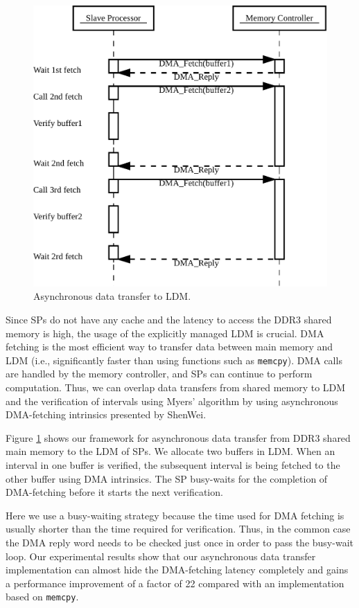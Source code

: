 \documentclass[conference]{IEEEtran}
\begin{document}
\begin{figure}[!htb]
  \includegraphics[width=1\linewidth]{figures/AsyncTrans}
  \caption{Asynchronous data transfer to LDM.}
  \label{AsyncTrans}
\end{figure}

Since SPs do not have any cache and the latency to access the DDR3
shared memory is high, the usage of the explicitly managed LDM is
crucial.  DMA fetching is the most efficient way to transfer data
between main memory and LDM (i.e., significantly faster than using
functions such as \texttt{memcpy}). DMA calls are handled by the
memory controller, and SPs can continue to perform computation. Thus,
we can overlap data transfers from shared memory to LDM and the
verification of intervals using Myers' algorithm by using asynchronous
DMA-fetching intrinsics presented by ShenWei.

Figure \ref{AsyncTrans} shows our framework for asynchronous data
transfer from DDR3 shared main memory to the LDM of SPs. We allocate
two buffers in LDM. When an interval in one buffer is verified, the
subsequent interval is being fetched to the other buffer using DMA
intrinsics. The SP busy-waits for the completion of DMA-fetching
before it starts the next verification.

Here we use a busy-waiting strategy because the time used for DMA
fetching is usually shorter than the time required for
verification. Thus, in the common case the DMA reply word needs to be
checked just once in order to pass the busy-wait loop. Our
experimental results show that our asynchronous data transfer
implementation can almost hide the DMA-fetching latency completely and
gains a performance improvement of a factor of 22 compared with an
implementation based on \texttt{memcpy}.
\end{document}

